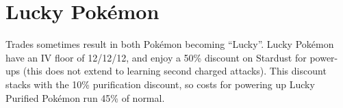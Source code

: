 \section{Lucky Pokémon}
\label{sec:lucky}
Trades sometimes result in both Pokémon becoming ``Lucky''.
Lucky Pokémon have an IV floor of 12/12/12, and enjoy a 50\% discount on Stardust for power-ups
  (this does not extend to learning second charged attacks).
This discount stacks with the 10\% purification discount, so costs for
  powering up Lucky Purified Pokémon run 45\% of normal.
